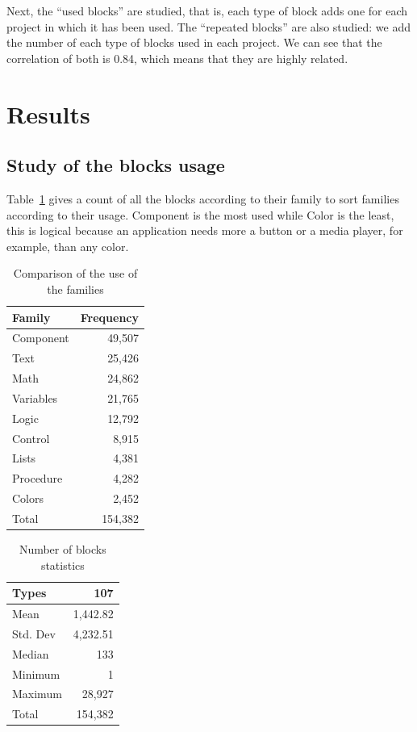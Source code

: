 \documentclass[a4paper]{article}
\begin{document}
Next, the ``used blocks'' are studied, that is, each type of block adds one for each project in which it has been used. The ``repeated blocks'' are also studied: we add the number of each type of blocks used in each project. We can see that the correlation of both is 0.84, which means that they are highly related.

\section{Results}
\subsection{Study of the blocks usage}
Table~\ref{tab:block-fam-comp} gives a count of all the blocks according to their family to sort families according to their usage. Component is the most used while Color is the least, this is logical because an application needs more a button or a media player, for example, than any color.

\begin{table}
\begin{center}
\caption{Comparison of the use of the families}
\bigskip
\label{tab:block-fam-comp}
\begin{tabular}{|l|r|}
\hline
\textbf{Family} & \textbf{Frequency} \\ \hline
Component & 49,507 \\ \hline
Text	& 25,426\\ \hline
Math & 24,862\\ \hline
Variables & 21,765\\ \hline
Logic & 12,792\\ \hline
Control & 8,915\\ \hline
Lists & 4,381\\ \hline
Procedure & 4,282\\ \hline
Colors & 2,452\\ \hline
Total & 154,382\\ \hline
\end{tabular}
\end{center}
\end{table}

\begin{table}[ht]
\begin{center}
\caption{Number of blocks statistics}
\bigskip
\label{tab:number-blocks}
\begin{tabular}{|l|r|}
\hline
Types & 107\\ \hline
Mean & 1,442.82\\ \hline
Std. Dev & 4,232.51\\ \hline
Median & 133\\ \hline
Minimum & 1\\ \hline
Maximum & 28,927\\ \hline
Total & 154,382\\ \hline
\end{tabular}
\end{center}
\end{table}
\end{document}
